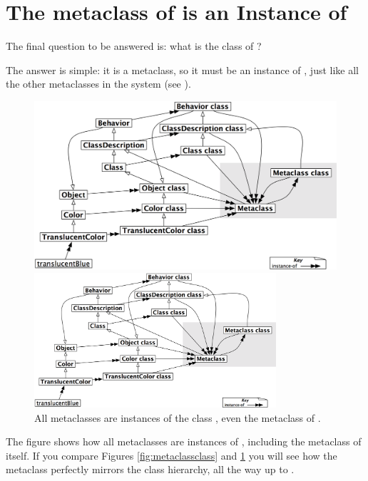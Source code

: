 \documentclass[a4paper,10pt,twoside]{book}
\begin{document}
\section{The metaclass of  is an Instance of }

The final question to be answered is: what is the class of ?

The answer is simple: it is a metaclass, so it must be an instance of , just like all the other metaclasses in the system (see ).

\begin{center}
\begin{figure}
\ifluluelse
	{\centerline{\includegraphics[width=\textwidth]{TranslucentMetaclassClassClass}}}
	{\centerline{\includegraphics[width=0.8\textwidth]{TranslucentMetaclassClassClass}}}
\caption{All metaclasses are instances of the class , even the metaclass of .\label{fig:metaclassclassclass}}
\end{figure}
\end{center}

The figure shows how all metaclasses are instances of , including the metaclass of  itself.
If you compare Figures \ref{fig:metaclassclass} and \ref{fig:metaclassclassclass} you will see how the metaclass  perfectly mirrors the class hierarchy, all the way up to .
\end{document}

